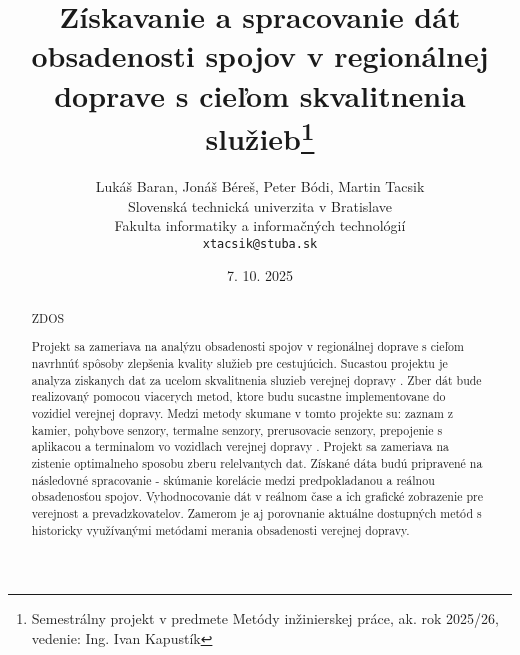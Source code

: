 \documentclass[10pt,twoside,slovak,a4paper]{article}
\title{Získavanie a spracovanie dát obsadenosti spojov v regionálnej doprave s cieľom skvalitnenia služieb\thanks{Semestrálny projekt v predmete Metódy inžinierskej práce, ak. rok 2025/26, vedenie: Ing. Ivan Kapustík}}
\author{Lukáš Baran,
Jonáš Béreš,
Peter Bódi,
Martin Tacsik\\[2pt]
	{\small Slovenská technická univerzita v Bratislave}\\
	{\small Fakulta informatiky a informačných technológií}\\
	{\small \texttt{xtacsik@stuba.sk}}
	}
\date{\small 7. 10. 2025}
\begin{document}
\maketitle



\begin{abstract}
ZDOS


Projekt sa zameriava na analýzu obsadenosti spojov v regionálnej doprave s cieľom navrhnúť spôsoby zlepšenia kvality služieb pre cestujúcich. 
Sucastou projektu je analyza ziskanych dat za ucelom skvalitnenia sluzieb verejnej dopravy . Zber dát bude realizovaný pomocou viacerych metod,  
ktore budu sucastne implementovane do vozidiel verejnej dopravy. Medzi metody skumane v tomto projekte su: zaznam z kamier, pohybove senzory, 
termalne senzory, prerusovacie senzory,   prepojenie s aplikacou a terminalom vo vozidlach verejnej dopravy . Projekt sa zameriava na zistenie 
optimalneho sposobu zberu relelvantych dat. Získané dáta budú pripravené na následovné spracovanie - skúmanie korelácie medzi predpokladanou a 
reálnou obsadenosťou spojov. Vyhodnocovanie dát v reálnom čase a ich grafické zobrazenie pre verejnost a prevadzkovatelov. Zamerom je aj porovnanie 
aktuálne dostupných metód s historicky využívanými metódami merania obsadenosti verejnej dopravy.

\end{abstract}
\end{document}
